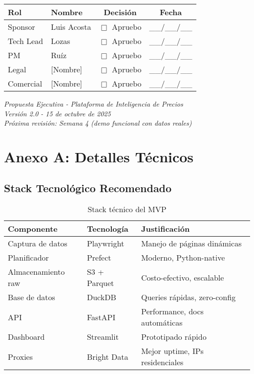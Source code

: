 \documentclass[12pt,a4paper]{article}
\begin{document}
\begin{table}[h]
\centering
\begin{tabularx}{\textwidth}{|l|X|c|c|}
\hline
\rowcolor{lightgray}
\textbf{Rol} & \textbf{Nombre} & \textbf{Decisión} & \textbf{Fecha} \\
\hline
Sponsor & Luis Acosta & $\Box$ Apruebo & \_\_/\_\_/\_\_ \\
\hline
Tech Lead & Lozas & $\Box$ Apruebo & \_\_/\_\_/\_\_ \\
\hline
PM & Ruíz & $\Box$ Apruebo & \_\_/\_\_/\_\_ \\
\hline
Legal & [Nombre] & $\Box$ Apruebo & \_\_/\_\_/\_\_ \\
\hline
Comercial & [Nombre] & $\Box$ Apruebo & \_\_/\_\_/\_\_ \\
\hline
\end{tabularx}
\end{table}

\vspace{2cm}

\begin{center}
\textit{Propuesta Ejecutiva - Plataforma de Inteligencia de Precios}\\
\textit{Versión 2.0 - 15 de octubre de 2025}\\
\vspace{0.5cm}
\textit{Próxima revisión: Semana 4 (demo funcional con datos reales)}
\end{center}

\newpage
\appendix
\section{Anexo A: Detalles Técnicos}

\subsection{Stack Tecnológico Recomendado}

\begin{table}[h]
\centering
\small
\begin{tabularx}{\textwidth}{|X|X|X|}
\hline
\rowcolor{lightgray}
\textbf{Componente} & \textbf{Tecnología} & \textbf{Justificación} \\
\hline
Captura de datos & Playwright & Manejo de páginas dinámicas \\
\hline
Planificador & Prefect & Moderno, Python-native \\
\hline
Almacenamiento raw & S3 + Parquet & Costo-efectivo, escalable \\
\hline
Base de datos & DuckDB & Queries rápidas, zero-config \\
\hline
API & FastAPI & Performance, docs automáticas \\
\hline
Dashboard & Streamlit & Prototipado rápido \\
\hline
Proxies & Bright Data & Mejor uptime, IPs residenciales \\
\hline
\end{tabularx}
\caption{Stack técnico del MVP}
\end{table}
\end{document}
